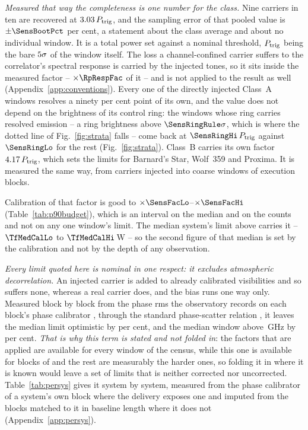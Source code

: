 \emph{Measured that way the completeness is one number for the class.} Nine
carriers in ten are recovered at $3.03\,P_{\rm trig}$, and the
sampling error of that pooled value is $\pm\SensBootPct$ per
cent, a statement about the class average and about no individual
window. It is a
total power set against a nominal threshold, $P_{\rm trig}$ being the bare
$5\sigma$ of the window itself. The loss a channel-confined
carrier suffers to the correlator's spectral response is carried by the
injected tones, so it sits inside the measured factor -- $\times\RpRespFac$
of it -- and is not applied to the result as well
(Appendix~\ref{app:conventions}). Every one of the \SensNInj{} directly
injected Class~A windows resolves a ninety per cent point of its own, and the
value does not depend on the brightness of its control ring: the
\SensNRingHi{} windows whose ring carries resolved emission -- a ring
brightness above $\SensRingRule\sigma$, which is where the dotted line of
Fig.~\ref{fig:strata} falls -- come back at
$\SensRingHi\,P_{\rm trig}$ against $\SensRingLo$ for the rest
(Fig.~\ref{fig:strata}). Class~B carries its own factor $4.17\,P_{\rm trig}$, which
sets the limits for Barnard's Star, Wolf~359 and Proxima. It is measured the
same way, from \SensNToneCoarse{} carriers injected into \SensNInjCoarse{}
coarse windows of \SensNInjCoarseBlock{} execution blocks.

Calibration of that factor is good to
$\times\SensFacLo$--$\times\SensFacHi$ (Table~\ref{tab:p90budget}), which is
an interval on the median and on the counts and not on any one window's
limit. The median system's limit above carries it -- $\TfMedCalLo$ to
$\TfMedCalHi$\,W -- so the second figure of that median is set by the
calibration and not by the depth of any observation.

\emph{Every limit quoted here is nominal in one respect: it excludes
atmospheric decorrelation.} An injected carrier is added to already
calibrated visibilities and so suffers none, whereas a real carrier does, and
the bias runs one way only. Measured block by block from the phase rms the
observatory records on each block's phase calibrator
\citep[\S\S10.4.11, 11.3.1]{ALMAHandbook}, through the standard phase-scatter
relation \citep[Eq.~3]{Richards2022}, it leaves the median limit optimistic
by \SensDecorPct{} per cent, and the median window above
\SensDecorHiGHz\,GHz by \SensDecorHiPct{} per cent.
\emph{That is why this term is stated and not
folded in}: the factors that are applied are available for every window
of the census, while this one is available for \SensDecorNBlk{} blocks of
\SensDecorNBlkTot{} and the rest are measurably the harder ones, so folding
it in where it is known would leave a set of limits that is neither corrected
nor uncorrected. Table~\ref{tab:persys} gives it system by system, measured
from the phase calibrator of a system's own block where the delivery exposes
one and imputed from the blocks matched to it in baseline length where it
does not (Appendix~\ref{app:persys}).

